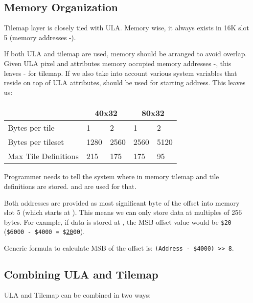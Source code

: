 \subsection{Memory Organization}

Tilemap layer is closely tied with ULA. Memory wise, it always exists in 16K slot 5 (memory addresses -).

If both ULA and tilemap are used, memory should be arranged to avoid overlap. Given ULA pixel and attributes memory occupied memory addresses -, this leaves - for tilemap. If we also take into account various system variables that reside on top of ULA attributes,  should be used for starting address. This leaves us:

{
    \def\arraystretch{1.2}
    \begin{tabular}{|l|l|l|l|l|}
        \hline
        & \multicolumn{2}{c|}{40x32} & \multicolumn{2}{c|}{80x32} \\
        \hline
        Bytes per tile & 1 & 2 & 1 & 2 \\
        \hline
        Bytes per tileset & 1280 & 2560 & 2560 & 5120 \\
        \hline
        Max Tile Definitions & 215 & 175 & 175 & 95 \\
        \hline
    \end{tabular}
}

Programmer needs to tell the system where in memory tilemap and tile definitions are stored.  and  are used for that.

Both addresses are provided as most significant byte of the offset into memory slot 5 (which starts at ). This means we can only store data at multiples of 256 bytes. For example, if data is stored at , the MSB offset value would be {\tt \$20} ({\tt \$6000 - \$4000 = \$\underline{20}00}).

Generic formula to calculate MSB of the offset is: {\tt (Address - \$4000) >> 8}.


\subsection{Combining ULA and Tilemap}

ULA and Tilemap can be combined in two ways:

